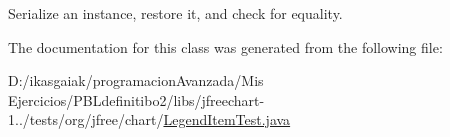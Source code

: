 Serialize an instance, restore it, and check for equality. 

The documentation for this class was generated from the following file\+:\begin{DoxyCompactItemize}
\item 
D\+:/ikasgaiak/programacion\+Avanzada/\+Mis Ejercicios/\+P\+B\+Ldefinitibo2/libs/jfreechart-\/1../tests/org/jfree/chart/\mbox{\hyperlink{_legend_item_test_8java}{Legend\+Item\+Test.\+java}}\end{DoxyCompactItemize}
